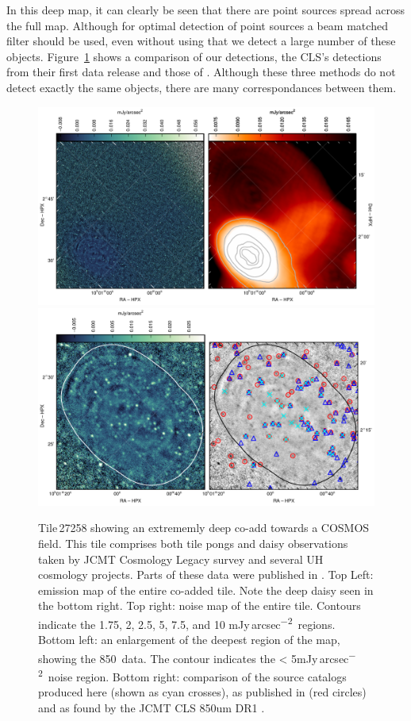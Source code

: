 \documentclass[twocolumn,times]{aastex6}
\newcommand{\jyas}{Jy\,arcsec\textsuperscript{$-$2}}
\begin{document}
In this deep map, it can clearly be seen that there are point sources
spread across the full map. Although for optimal detection of point
sources a beam matched filter should be used, even without using that
we detect a large number of these objects. Figure~\ref{fig:t27258}
shows a comparison of our detections, the CLS's detections from their
first data release \citep{Geach2016} and those of
\citet{Casey2013}. Although these three methods do not detect exactly the
same objects, there are many correspondances between them.

\begin{figure}
  \includegraphics{27258-whole-map.pdf}
  \\[3mm]
  \includegraphics{27258-zoomin.pdf}
  \caption{Tile\,27258 showing an extrememly deep co-add towards a
    COSMOS field. This tile comprises both tile pongs and daisy
    observations taken by JCMT
    Cosmology Legacy survey and several UH cosmology projects. Parts of
    these data were published in
    \citet{Casey2013,Chen2013,Chen2013a,Geach2016}. Top Left: emission
    map of the entire co-added tile. Note the deep daisy seen in the
    bottom right. Top right: noise map of the entire tile. Contours
    indicate the 1.75, 2, 2.5, 5, 7.5, and 10 m\jyas\ regions. Bottom
    left: an enlargement of the deepest region of the map, showing the
    850\micron\ data. The contour indicates the < 5m\jyas\ noise
    region. Bottom right: comparison of the source catalogs produced
    here (shown as cyan crosses), as published in \citealt{Casey2013}
    (red circles) and as found by the JCMT CLS 850um DR1 \citep[blue
    triangles]{Geach2016}. }
  \label{fig:t27258}
\end{figure}
\end{document}
